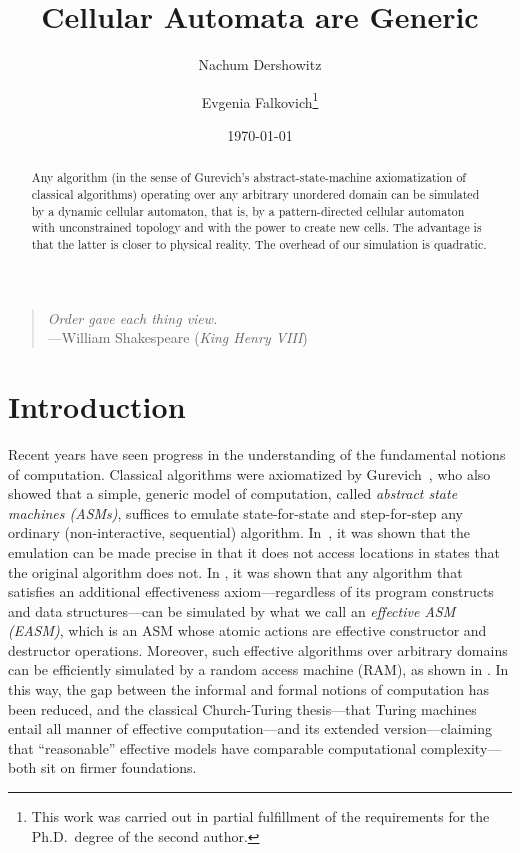 \documentclass[submission,copyright,creativecommons,english]{eptcs}
\title{Cellular Automata are Generic}
\author{Nachum Dershowitz 
\institute{School of Computer Science\\Tel Aviv University\\Tel Aviv, Israel}
\email{nachum.dershowitz@cs.tau.ac.il}
\and Evgenia Falkovich\footnote{This work was carried out in partial fulfillment of the requirements for the Ph.D.\ degree
of the second author.}
\institute{School of Computer Science\\Tel Aviv University\\Tel Aviv, Israel}
\email{jenny.falkovich@gmail.com}}
\date{\today}
\begin{document}
\maketitle
\begin{abstract}
Any algorithm (in the sense of Gurevich's abstract-state-machine axiomatization of classical algorithms) operating over any arbitrary unordered domain can be simulated by a dynamic cellular automaton, that is, by a pattern-directed cellular automaton with unconstrained topology and with the power to create new cells.  
The advantage is that the latter is closer to physical reality.
The overhead of our simulation is quadratic.
\end{abstract}

\begin{quote}\raggedleft
\textit{Order gave each thing view.}\\[1ex]
\small---William Shakespeare (\textit{King Henry VIII})
\end{quote}

\section{Introduction} 

Recent years have seen progress in the understanding of the fundamental notions of computation.
Classical algorithms were axiomatized by Gurevich~\cite{ASM-Theorem-Gurevich}, who also showed that a simple, generic model of computation, called \emph{abstract state machines (ASMs)}, suffices to emulate state-for-state and step-for-step any
ordinary (non-interactive, sequential) algorithm.
In~\cite{Exact}, it was shown that the emulation can be made precise in that it does not access locations in states that the original algorithm does not.
In \cite{CT_ASM,BSL}, it was shown that any algorithm that satisfies an additional effectiveness axiom---regardless of its program constructs and data structures---can be simulated by what we call an \emph{effective ASM (EASM)}, which is an ASM whose atomic actions are effective constructor and destructor operations.
Moreover, such effective algorithms over arbitrary domains can be efficiently simulated by a random access machine (RAM), as shown in \cite{ECTT,invariance}.
In this way, the gap between the
informal and formal notions of computation has been reduced, and
the classical Church-Turing thesis---that Turing machines entail all manner of effective computation---and its extended version---claiming that ``reasonable'' effective models have comparable computational complexity---both sit on firmer foundations.
\end{document}
